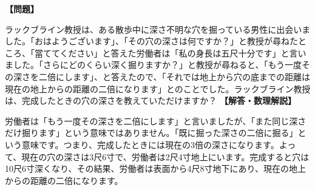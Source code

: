 \documentclass[10pt,a4paper,oneside,openany]{ltjsbook}
\begin{document}
\begin{tcolorbox}[colback=softblue,colframe=primaryblue,title=\textbf{第 100 問：労働者のパズル （原題: THE LABOURER'S PUZZLE.）},arc=2mm,boxrule=1pt,breakable]
\textbf{【問題】}\par\vspace{0.3em}
ラックブライン教授は、ある散歩中に深さ不明な穴を掘っている男性に出会いました。「おはようございます」、「その穴の深さは何ですか？」と教授が尋ねたところ、「當ててください」と答えた労働者は「私の身長は五尺十分です」と言いました。「さらにどのくらい深く掘りますか？」と教授が尋ねると、「もう一度その深さを二倍にします」、と答えたので、「それでは地上から穴の底までの距離は現在の地上からの距離の二倍になります」とのことでした。ラックブライン教授は、完成したときの穴の深さを教えていただけますか？
\tcblower
\textbf{【解答・数理解説】}\par\vspace{0.3em}
労働者は「もう一度その深さを二倍にします」と言いましたが、「また同じ深さだけ掘ります」という意味ではありません。「既に掘った深さの二倍に掘る」という意味です。つまり、完成したときには現在の3倍の深さになります。よって、現在の穴の深さは3尺6寸で、労働者は2尺4寸地上にいます。完成すると穴は10尺6寸深くなり、その結果、労働者は表面から4尺8寸地下にあり、現在の地上からの距離の二倍になります。
\end{tcolorbox}
\end{document}
